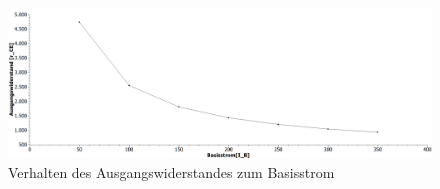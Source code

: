         \begin{figure}[!ht]
            \centering
            \includegraphics[width=\linewidth]{Bilder/26.PNG}
            \caption{Verhalten des Ausgangswiderstandes zum Basisstrom}
        \end{figure}








